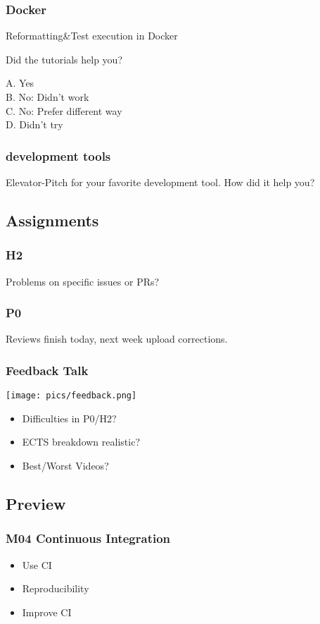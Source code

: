\begin{frame}
	\frametitle{Docker}

	Reformatting\&Test execution in Docker

	Did the tutorials help you?

	A. Yes \\
	B. No: Didn't work \\
	C. No: Prefer different way \\
	D. Didn't try
\end{frame}

\begin{frame}
	\frametitle{development tools}

	\begin{task}
	Elevator-Pitch for your favorite development tool.
	How did it help you?
	\end{task}
\end{frame}

\breakframe


\subsection{Assignments}

\begin{assignment}
	\frametitle{H2}

	\begin{task}
	Problems on specific issues or PRs?
	\end{task}
\end{assignment}

\begin{assignment}
	\frametitle{P0}

	\begin{task}
	Reviews finish today, next week upload corrections.
	\end{task}
\end{assignment}

\begin{frame}
	\frametitle{Feedback Talk}

	\hfill \texttt{[image: pics/feedback.png]}
	\vspace{-1cm}
	\begin{itemize}
		\item Difficulties in P0/H2?
		\item ECTS breakdown realistic?
		\item Best/Worst Videos?
	\end{itemize}
\end{frame}

\subsection{Preview}

\begin{frame}
	\frametitle{M04 Continuous Integration}

	\begin{itemize}
	\item Use CI
	\item Reproducibility
	\item Improve CI
	\end{itemize}
\end{frame}



